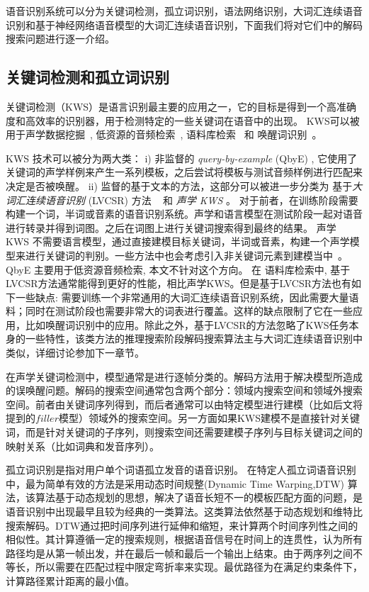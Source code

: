 语音识别系统可以分为关键词检测，孤立词识别，语法网络识别，大词汇连续语音识别和基于神经网络语音模型的大词汇连续语音识别，下面我们将对它们中的解码搜索问题进行逐一介绍。

\subsection{关键词检测和孤立词识别}
\label{chap:intro-kws-dec}

关键词检测（KWS）是语言识别最主要的应用之一，它的目标是得到一个高准确度和高效率的识别器，用于检测特定的一些关键词在语音中的出现。
KWS可以被用于声学数据挖掘~\cite{zhou2005data}, 低资源的音频检索~\cite{shen2009comparison}, 
语料库检索~\cite{garofolo2000trec} 和 唤醒词识别~\cite{chen2014small}。

KWS 技术可以被分为两大类：
i) 非监督的  {\em query-by-example} (QbyE) \cite{zhang2009unsupervised,barakat2012improved,chen2015query}, 它使用了关键词的声学样例来产生一系列模板，之后尝试将模板与测试音频样例进行匹配来决定是否被唤醒。
ii) 监督的基于文本的方法，这部分可以被进一步分类为  基于{\em 大词汇连续语音识别} (LVCSR)  方法 ~\cite{garofolo2000trec,ng2000subword} 和  {\em 声学 KWS} \cite{mandal2014recent}。
对于前者，在训练阶段需要构建一个词，半词或音素的语音识别系统。声学和语言模型在测试阶段一起对语音进行转录并得到词图。之后在词图上进行关键词搜索得到最终的结果。
声学 KWS 不需要语言模型，通过直接建模目标关键词，半词或音素，构建一个声学模型来进行关键词的判别。一些方法中也会考虑引入非关键词元素到建模当中~\cite{sukkar1996utterance}。
QbyE 主要用于低资源音频检索, 本文不针对这个方向。 
在 语料库检索中, 基于LVCSR方法通常能得到更好的性能，相比声学KWS。但是基于LVCSR方法也有如下一些缺点: 需要训练一个非常通用的大词汇连续语音识别系统，因此需要大量语料；同时在测试阶段也需要非常大的词表进行覆盖。这样的缺点限制了它在一些应用，比如唤醒词识别中的应用。除此之外，基于LVCSR的方法忽略了KWS任务本身的一些特性，该类方法的推理搜索阶段解码搜索算法主与大词汇连续语音识别中类似，详细讨论参加下一章节。

在声学关键词检测中，模型通常是进行逐帧分类的。解码方法用于解决模型所造成的误唤醒问题。解码的搜索空间通常包含两个部分：领域内搜索空间和领域外搜索空间。前者由关键词序列得到，而后者通常可以由特定模型进行建模（比如后文将提到的$filler$模型）领域外的搜索空间。另一方面如果KWS建模不是直接针对关键词，而是针对关键词的子序列，则搜索空间还需要建模子序列与目标关键词之间的映射关系（比如词典和发音序列）。

孤立词识别是指对用户单个词语孤立发音的语音识别。
在特定人孤立词语音识别中，最为简单有效的方法是采用动态时间规整(Dynamic Time Warping,DTW) 算法，该算法基于动态规划的思想，解决了语音长短不一的模板匹配方面的问题，是语音识别中出现最早且较为经典的一类算法。这类算法依然基于动态规划和维特比搜索解码。DTW通过把时间序列进行延伸和缩短，来计算两个时间序列性之间的相似性。其计算遵循一定的搜索规则，根据语音信号在时间上的连贯性，认为所有路径均是从第一帧出发，并在最后一帧和最后一个输出上结束。由于两序列之间不等长，所以需要在匹配过程中限定弯折率来实现。最优路径为在满足约束条件下，计算路径累计距离的最小值。




